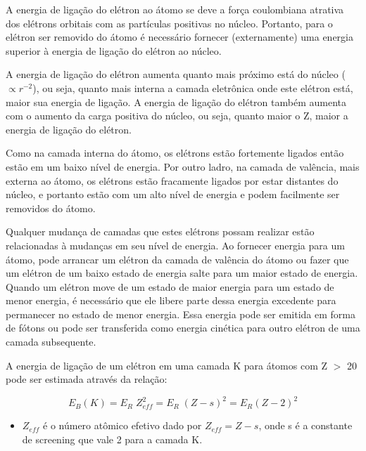 \documentclass[11pt,a4paper]{article}
\newcounter{exemplo}
\begin{document}
	A energia de ligação do elétron ao átomo se deve a força coulombiana atrativa dos elétrons orbitais com as partículas positivas no núcleo. Portanto, para o elétron ser removido do átomo é necessário fornecer (externamente) uma energia superior à energia de ligação do elétron ao núcleo. 

    A energia de ligação do elétron aumenta quanto mais próximo está do núcleo ($\varpropto r^{-2}$), ou seja, quanto mais interna a camada eletrônica onde este elétron está, maior sua energia de ligação. A energia de ligação do elétron também aumenta com o aumento da carga positiva do núcleo, ou seja, quanto maior o Z, maior a energia de ligação do elétron.

    Como na camada interna do átomo, os elétrons estão fortemente ligados então estão em um baixo nível de energia. Por outro ladro, na camada de valência, mais externa ao átomo, os elétrons estão fracamente ligados por estar distantes do núcleo, e portanto estão com um alto nível de energia e podem facilmente ser removidos do átomo.

    Qualquer mudança de camadas que estes elétrons possam realizar estão relacionadas à mudanças em seu nível de energia. Ao fornecer energia para um átomo, pode arrancar um elétron da camada de valência do átomo ou fazer que um elétron de um baixo estado de energia salte para um maior estado de energia. Quando um elétron move de um estado de maior energia para um estado de menor energia, é necessário que ele libere parte dessa energia excedente para permanecer no estado de menor energia. Essa energia pode ser emitida em forma de fótons ou pode ser transferida como energia cinética para outro elétron de uma camada subsequente.

    A energia de ligação de um elétron em uma camada K para átomos com Z $>$ 20 pode ser estimada através da relação:

		\begin{equation}
			E_B(K) = E_R \; Z_{eff}^2 = E_R \; (Z - s)^2 = E_R(Z - 2)^2
		\end{equation}

		\begin{exemplo}[onde:]
			\begin{itemize}
				\item $Z_{eff}$ é o número atômico efetivo dado por $Z_{eff} = Z - s$, onde s é a constante de screening que vale 2 para a camada K.
			\end{itemize}
		\end{exemplo}
\end{document}
